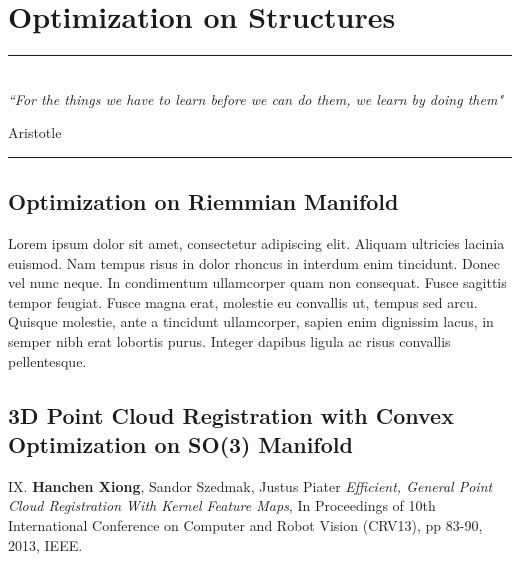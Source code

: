 
\chapter{Optimization on Structures} %
\label{Chapter5} %



\rule{\textwidth}{0.4pt} \\[0.5cm]
\textit{``For the things we have to learn before we can do them, we learn by doing them"}

\begin{flushright}
Aristotle
\end{flushright}
\rule{\textwidth}{0.4pt} 


\section{Optimization on Riemmian Manifold}

Lorem ipsum dolor sit amet, consectetur adipiscing elit. Aliquam ultricies lacinia euismod. Nam tempus risus in dolor rhoncus in interdum enim tincidunt. Donec vel nunc neque. In condimentum ullamcorper quam non consequat. Fusce sagittis tempor feugiat. Fusce magna erat, molestie eu convallis ut, tempus sed arcu. Quisque molestie, ante a tincidunt ullamcorper, sapien enim dignissim lacus, in semper nibh erat lobortis purus. Integer dapibus ligula ac risus convallis pellentesque.

\section{3D Point Cloud Registration with Convex Optimization on SO(3) Manifold}
\begin{shaded}
 {\Huge IX.} \textbf{Hanchen Xiong}, Sandor Szedmak, Justus Piater {\it Efficient, General Point Cloud Registration With Kernel Feature Maps}, 
In Proceedings of 10th International Conference on Computer and Robot Vision (CRV13), pp 83-90, 2013, IEEE.
\end{shaded}




